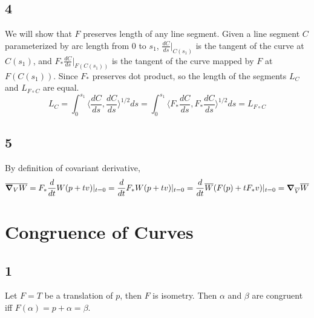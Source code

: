 \documentclass[12pt]{article}
\begin{document}
\subsection*{4}
We will show that $F$ preserves length of any line segment. Given a line segment $C$ parameterized by arc length from $0$ to $s_1$, $\frac{dC}{ds} |_{C(s_1)}$ is the tangent of the curve at $C(s_1)$, and $F_*\frac{dC}{ds}|_{F(C(s_1))}$ is the tangent of the curve mapped by $F$ at $F(C(s_1))$. Since $F_*$ preserves dot product, so the length of the segments $L_C$ and $L_{F \circ C}$ are equal.
$$L_C = \int_0^{s_1} \langle \frac{dC}{ds},  \frac{dC}{ds} \rangle^{1/2} ds = \int_0^{s_1} \langle F_* \frac{dC}{ds},  F_* \frac{dC}{ds} \rangle^{1/2} ds = L_{F \circ C}$$ 


\subsection*{5}
 By definition of covariant derivative, $$\overline{\grad_V W} = F_* \frac{d}{dt} W(p + tv) |_{t=0} =   \frac{d}{dt}F_* W(p + tv) |_{t=0} =  \frac{d}{dt} \overline{W}(F(p) + t F_* v) |_{t=0} = \grad_{\overline{V}} \overline{W}$$

\section{Congruence of Curves}
\subsection*{1}
Let $F=T$ be a translation of $p$,  then $F$ is isometry. Then $\alpha$ and $\beta$ are congruent iff $F(\alpha) = p + \alpha = \beta$.
\end{document}
